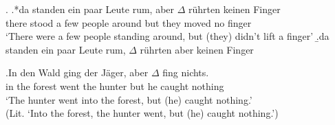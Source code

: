 \ex.
\ag.*\label{ex:aber.pos.ug}da standen ein paar Leute rum, aber $\Delta$ rührten keinen Finger\\
there stood a few people around but they moved no finger \\
`There were a few people standing around, but (they) didn't lift a finger'
\b.\label{ex:aber.pos.g}da standen ein paar Leute rum, $\Delta$ rührten aber keinen Finger \citep[13, his judgments]{hohle1983}

\exg.\label{ex:aber.wunderlich}In den Wald ging der Jäger, aber $\Delta$ fing nichts.\\
in the forest went the hunter but he caught nothing\\
`The hunter went into the forest, but (he) caught nothing.' \\(Lit. `Into the forest, the hunter went, but (he) caught nothing.') \citep[308, his judgment]{wunderlich1988}

